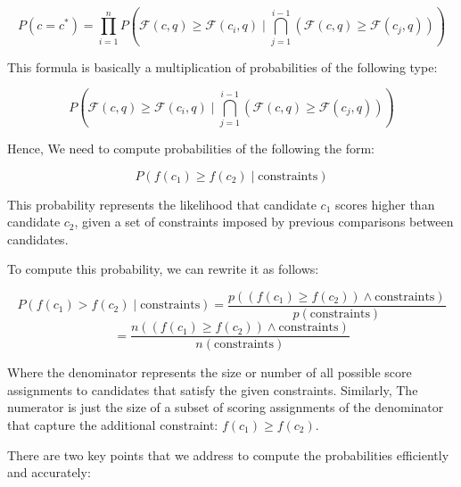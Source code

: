 \[
P(c = c^*) = \prod_{i=1}^{n} P\left(\mathcal{F}(c, q) \geq \mathcal{F}(c_i, q) \mid \bigcap_{j=1}^{i-1} \left( \mathcal{F}(c, q) \geq \mathcal{F}(c_j, q) \right) \right)
\]

This formula is basically a multiplication of probabilities of the following type:

\[
P(\mathcal{F}(c, q) \geq \mathcal{F}(c_i, q) \mid \bigcap_{j=1}^{i-1} \left( \mathcal{F}(c, q) \geq \mathcal{F}(c_j, q) \right))
\]

Hence, We need to compute probabilities of the following the form:

\[
P(f(c_1) \geq f(c_2) \mid \text{constraints})
\]

This probability represents the likelihood that candidate \( c_1 \) scores higher than candidate \( c_2 \), given a set of constraints imposed by previous comparisons between candidates.

To compute this probability, we can rewrite it as follows:

\[
P(f(c_1) > f(c_2) \mid \text{constraints}) = \frac{p((f(c_1) \geq f(c_2)) \land \text{constraints})}{p(\text{constraints})} 
\]
\[
= \frac{n((f(c_1) \geq f(c_2)) \land \text{constraints})}{n(\text{constraints})}
\]

Where the denominator represents the size or number of all possible score assignments to candidates that satisfy the given constraints. Similarly, The numerator is just the size of a subset of  scoring assignments of the denominator that capture the additional constraint: \( f(c_1) \geq f(c_2) \). 

There are two key points that we address to compute the probabilities efficiently and accurately:

